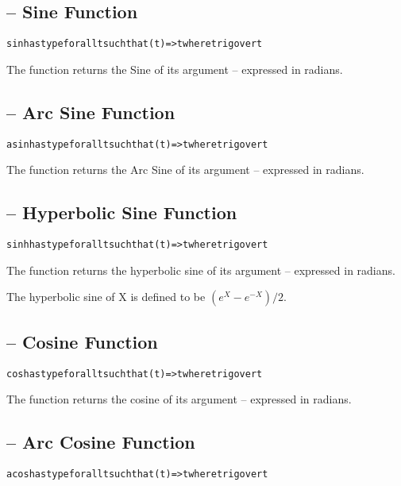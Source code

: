 \subsection{ -- Sine Function}
\begin{alltt}
sin has type for all t such that (t)=>t where trig over t
\end{alltt}

The  function returns the Sine of its argument -- expressed in radians.

\subsection{ -- Arc Sine Function}
\begin{alltt}
asin has type for all t such that (t)=>t where trig over t
\end{alltt}

The  function returns the Arc Sine of its argument -- expressed in radians.

\subsection{ -- Hyperbolic Sine Function}
\begin{alltt}
sinh has type for all t such that (t)=>t where trig over t
\end{alltt}

The  function returns the hyperbolic sine of its argument -- expressed in radians.

The hyperbolic sine of X is defined to be $(e^X - e^{-X})/2$.

\subsection{ -- Cosine Function}
\begin{alltt}
cos has type for all t such that (t)=>t where trig over t
\end{alltt}

The  function returns the cosine of its argument -- expressed in radians.

\subsection{ -- Arc Cosine Function}
\begin{alltt}
acos has type for all t such that (t)=>t where trig over t
\end{alltt}

